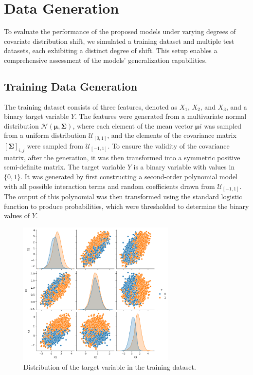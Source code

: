 \chapter{Data Generation}

To evaluate the performance of the proposed models under varying degrees of covariate distribution shift, we simulated a training dataset and multiple test datasets, each exhibiting a distinct degree of shift. 
This setup enables a comprehensive assessment of the models' generalization capabilities.

\section{Training Data Generation}

The training dataset consists of three features, denoted as $X_1$, $X_2$, and $X_3$, and a binary target variable $Y$. The features were generated from a multivariate normal distribution $\mathcal{N}(\boldsymbol{\mu}, \boldsymbol{\Sigma})$, where each element of the mean vector $\boldsymbol{\mu}i$ was sampled from a uniform distribution $\mathcal{U}_{[0, 1]}$, and the elements of the covariance matrix $[\boldsymbol{\Sigma}]_{i,j}$ were sampled from $\mathcal{U}_{[-1, 1]}$. To ensure the validity of the covariance matrix, after the generation, it was then transformed into a symmetric positive semi-definite matrix.
The target variable $Y$ is a binary variable with values in $\{0, 1\}$. It was generated by first constructing a second-order polynomial model with all possible interaction terms and random coefficients drawn from $\mathcal{U}_{[-1, 1]}$. The output of this polynomial was then transformed using the standard logistic function to produce probabilities, which were thresholded to determine the binary values of $Y$.

\begin{figure}
    \centering
    \includegraphics[width=0.7\textwidth]{assets/label_dist_train.png}
    \caption{Distribution of the target variable in the training dataset.}
    \label{fig:label_dist_train}
\end{figure}


